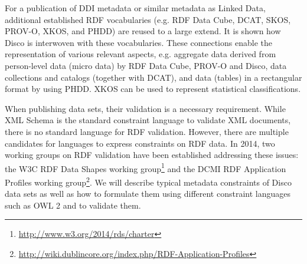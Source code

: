 \documentclass{llncs}
\begin{document}
For a publication of DDI metadata or similar metadata as Linked Data, additional established RDF vocabularies (e.g. RDF Data Cube, DCAT, SKOS, PROV-O, XKOS, and PHDD) are reused to a large extend. It is shown how Disco is interwoven with these vocabularies. 
These connections enable the representation of various relevant aspects, e.g. aggregate data derived from person-level data (micro data) by RDF Data Cube, PROV-O and Disco, data collections and catalogs (together with DCAT), and data (tables) in a rectangular format by using PHDD. XKOS can be used to represent statistical classifications.

When publishing data sets, their validation is a necessary requirement.
While XML Schema is the standard constraint language to validate XML documents, there is no standard language for RDF validation.
However, there are multiple candidates for languages to express constraints on RDF data.
In 2014, two working groups on RDF validation have been established addressing these issues: the W3C RDF Data Shapes working group\footnote{\url{http://www.w3.org/2014/rds/charter}} and the DCMI RDF Application Profiles working group\footnote{\url{http://wiki.dublincore.org/index.php/RDF-Application-Profiles}}.
We will describe typical metadata constraints of Disco data sets as well as how to formulate them using different constraint languages such as OWL 2 and to validate them.
\end{document}
